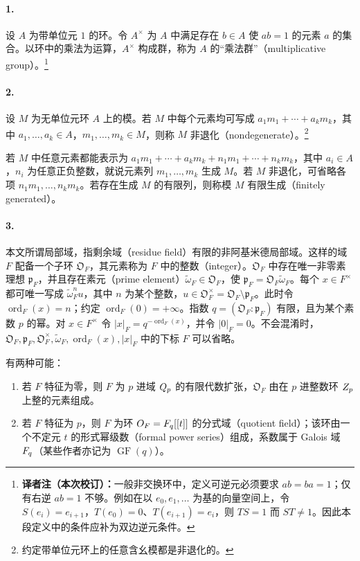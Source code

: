 \paragraph*{1.}
设 $A$ 为带单位元 $1$ 的环。令 $A^\times$ 为 $A$ 中满足存在 $b\in A$ 使 $ab=1$ 的元素 $a$ 的集合。以环中的乘法为运算，$A^\times$ 构成群，称为 $A$ 的“乘法群”（multiplicative group）。\footnote{\textbf{译者注（本次校订）：}一般非交换环中，定义可逆元必须要求 $ab=ba=1$；仅有右逆 $ab=1$ 不够。例如在以 $e_0,e_1,\ldots$ 为基的向量空间上，令 $S(e_i)=e_{i+1}$，$T(e_0)=0$、$T(e_{i+1})=e_i$，则 $TS=1$ 而 $ST\ne1$。因此本段定义中的条件应补为双边逆元条件。}
\paragraph*{2.}
设 $M$ 为无单位元环 $A$ 上的模。若 $M$ 中每个元素均可写成 $a_1m_1+\cdots+a_km_k$，其中 $a_1,\ldots,a_k\in A$，$m_1,\ldots,m_k\in M$，则称 $M$ 非退化（nondegenerate）。\footnote{约定带单位元环上的任意含幺模都是非退化的。}

若 $M$ 中任意元素都能表示为 $a_1m_1+\cdots+a_km_k+n_1m_1+\cdots+n_km_k$，其中 $a_i\in A$，$n_i$ 为任意正负整数，就说元素列 $m_1,\ldots,m_k$ 生成 $M$。若 $M$ 非退化，可省略各项 $n_1m_1,\ldots,n_km_k$。若存在生成 $M$ 的有限列，则称模 $M$ 有限生成（finitely generated）。
\paragraph*{3.}
本文所谓局部域，指剩余域（residue field）有限的非阿基米德局部域。这样的域 $F$ 配备一个子环 $\mathfrak O_F$，其元素称为 $F$ 中的整数（integer）。$\mathfrak O_F$ 中存在唯一非零素理想 $\mathfrak p_F$，并且存在素元（prime element）$\widetilde\omega_F\in\mathfrak O_F$，使 $\mathfrak p_F=\mathfrak O_F\widetilde\omega_F$。每个 $x\in F^\times$ 都可唯一写成 $\widetilde\omega_F^n u$，其中 $n$ 为某个整数，$u\in\mathfrak O_F^\times=\mathfrak O_F\setminus\mathfrak p_F$。此时令 $\operatorname{ord}_F(x)=n$；约定 $\operatorname{ord}_F(0)=+\infty$。指数 $q=(\mathfrak O_F:\mathfrak p_F)$ 有限，且为某个素数 $p$ 的幂。对 $x\in F^\times$ 令 $|x|_F=q^{-\operatorname{ord}_F(x)}$，并令 $|0|_F=0$。不会混淆时，$\mathfrak O_F,\mathfrak p_F,\mathfrak O_F^\times,\widetilde\omega_F,\operatorname{ord}_F(x),|x|_F$ 中的下标 $F$ 可以省略。

有两种可能：
\begin{enumerate}
\item[(a)] 若 $F$ 特征为零，则 $F$ 为 $p$ 进域 $Q_p$ 的有限代数扩张，$\mathfrak O_F$ 由在 $p$ 进整数环 $Z_p$ 上整的元素组成。
\item[(b)] 若 $F$ 特征为 $p$，则 $F$ 为环 $O_F=F_q[[t]]$ 的分式域（quotient field）；该环由一个不定元 $t$ 的形式幂级数（formal power series）组成，系数属于 Galois 域 $F_q$（某些作者亦记为 $\operatorname{GF}(q)$）。
\end{enumerate}
